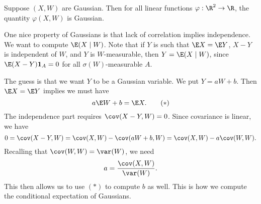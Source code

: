\documentclass[a4paper]{article}
\begin{document}
\begin{eg}
  Suppose $(X, W)$ are Gaussian. Then for all linear functions $\varphi: \R^2 \to \R$, the quantity $\varphi(X, W)$ is Gaussian.

  One nice property of Gaussians is that lack of correlation implies independence. We want to compute $\E(X \mid W)$. Note that if $Y$ is such that $\E X = \E Y$, $X - Y$ is independent of $W$, and $Y$ is $W$-measurable, then $Y = \E(X \mid W)$, since
  $\E(X - Y) \mathbf{1}_A = 0$ for all $\sigma(W)$-measurable $A$.

  The guess is that we want $Y$ to be a Gaussian variable. We put $Y = aW + b$. Then $\E X = \E Y$ implies we must have
  \[
    a \E W + b = \E X.\tag{$*$}
  \]
  The independence part requires $\cov(X - Y, W) = 0$. Since covariance is linear, we have
  \[
    0 = \cov(X - Y, W) = \cov(X, W) - \cov(aW + b, W) = \cov(X, W) - a \cov(W, W).
  \]
  Recalling that $\cov(W, W) = \var(W)$, we need
  \[
    a = \frac{\cov(X, W)}{\var(W)}.
  \]
  This then allows us to use $(*)$ to compute $b$ as well. This is how we compute the conditional expectation of Gaussians.
\end{eg}
\end{document}
